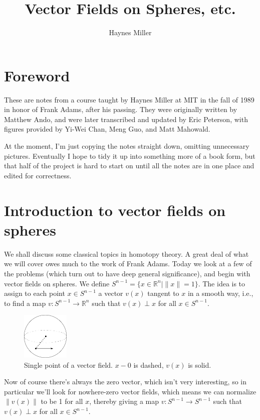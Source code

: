 \documentclass{article}
\title{Vector Fields on Spheres, etc.}
\author{Haynes Miller}
\newcommand{\R}{\mathbb{R}}
\begin{document}
\maketitle
\tableofcontents

\section{Foreword} %

These are notes from a course taught by Haynes Miller at MIT in the fall of 1989 in honor of Frank Adams, after his passing.  They were originally written by Matthew Ando, and were later transcribed and updated by Eric Peterson, with figures provided by Yi-Wei Chan, Meng Guo, and Matt Mahowald.

At the moment, I'm just copying the notes straight down, omitting unnecessary pictures.  Eventually I hope to tidy it up into something more of a book form, but that half of the project is hard to start on until all the notes are in one place and edited for correctness.


\section{Introduction to vector fields on spheres} %
We shall discuss some classical topics in homotopy theory.  A great deal of what we will cover owes much to the work of Frank Adams.  Today we look at a few of the problems (which turn out to have deep general significance), and begin with vector fields on spheres.  We define $S^{n-1} = \{x \in \R^n \mid \|x\| = 1\}$.  The idea is to assign to each point $x \in S^{n-1}$ a vector $v(x)$ tangent to $x$ in a smooth way, i.e., to find a map $v: S^{n-1} \to \R^n$ such that $v(x) \perp x$ for all $x \in S^{n-1}$.

\begin{figure}
\centering\includegraphics[width=0.2\textwidth]{figures/fig1.pdf}
\caption{\small Single point of a vector field. $x - 0$ is dashed, $v(x)$ is solid.}
\end{figure}

Now of course there's always the zero vector, which isn't very interesting, so in particular we'll look for nowhere-zero vector fields, which means we can normalize $\|v(x)\|$ to be 1 for all $x$, thereby giving a map $v: S^{n-1} \to S^{n-1}$ such that $v(x) \perp x$ for all $x \in S^{n-1}$. %
\end{document}
